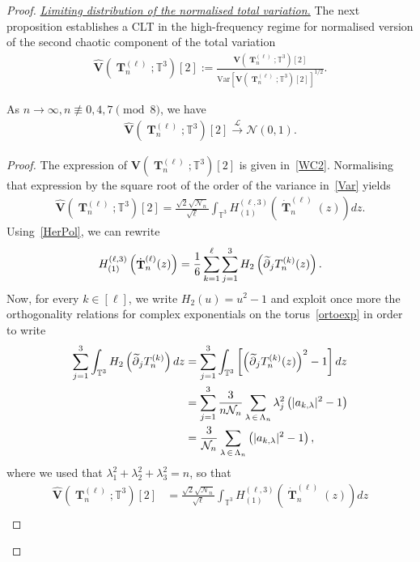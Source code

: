 \documentclass[AHL,Unicode,longabstracts,published]{cedram}
\DeclareMathOperator{\bT}{\mathbf{T}}
\newcommand{\scN}{\mathscr{N}}
\newcommand{\bfv}{\mathbf{V}}
\newcommand{\T}{\mathbb{T}^3}
\newcommand{\V}[1]{\mathrm{Var}{\left[#1\right]}}
\newcommand{\Law}{\xrightarrow[]{\mathcal{L}} }
\newcommand{\notcon}[3]{ {#1} \not\equiv {#2} \pmod {#3} }
\newcommand{\Nn}{\mathcal{N}_n}
\let\oldtilde\tilde
\renewcommand*{\tilde}[1]{\mathchoice{\widetilde{#1}}{\widetilde{#1}}{\oldtilde{#1}}{\oldtilde{#1}}}
\begin{document}
\begin{proof}
\medskip
\noindent\underline{\emph{Limiting distribution of the normalised total variation.}} The next proposition establishes a CLT in the high-frequency regime for normalised version of the second chaotic component of the total variation
\begin{gather}\label{nor2}
\widehat{\bfv}\left(\bT_n^{(\ell)};\T\right)[2]:=\frac{\bfv\left(\bT_n^{(\ell)};\T\right)[2]}{\V{\bfv\left(\bT_n^{(\ell)};\T\right)[2]}^{1/2}}.
\end{gather}

\begin{prop}\label{Lim2}
As $n\to \infty, \notcon{n}{0,4,7}{8}$, we have
\begin{gather*}
\widehat{\bfv}\left(\bT_n^{(\ell)};\T\right)[2] \Law \scN(0,1).
\end{gather*}
\end{prop}
\begin{proof}
The expression of $\bfv(\bT_n^{(\ell)};\T)[2]$ is given in~\eqref{WC2}. Normalising that expression by the square root of the order of the variance in~\eqref{Var} yields
\begin{gather*}
\widehat{\bfv}\left(\bT_n^{(\ell)};\T\right)[2] = \frac{\sqrt{2}\sqrt{\Nn}}{\sqrt{\ell}} \int_{\T} H_{(1)}^{(\ell,3)}\left(\dot{\bT}_n^{(\ell)}(z)\right) dz.
\end{gather*}
Using~\eqref{HerPol}, we can rewrite
\begin{gather*}
H_{(1)}^{(\ell,3)}\left(\dot{\bT}_n^{(\ell)}(z)\right) = \frac{1}{6}\sum_{k=1}^{\ell} \sum_{j=1}^{3} H_2\left(\tilde{\partial}_jT_n^{(k)}(z)\right).
\end{gather*}
Now, for every $k\in [\ell]$, we write $H_2(u)=u^2-1$ and exploit once more the orthogonality relations for complex exponentials on the torus~\eqref{ortoexp} in order to write
\begin{align*}
\sum_{j=1}^3\int_{\T} H_2\left(\tilde{\partial}_jT_n^{(k)}\right) dz &=\sum_{j=1}^3\int_{\T}\left[\left(\tilde{\partial}_jT_n^{(k)}(z)\right)^2 -1\right] dz \\
&=\sum_{j=1}^3\frac{3}{n\Nn} \sum_{\lambda\,\in\,\Lambda_n} \lambda_j^2\left(|a_{k,\lambda}|^2-1\right)\\
&= \frac{3}{\Nn}\sum_{\lambda\,\in \,\Lambda_n}\left(|a_{k,\lambda}|^2-1\right),
\end{align*}
where we used that $\lambda_1^2+\lambda_2^2+\lambda_3^2=n$, so that
\begin{equation}\label{tildaV2}
\begin{split}
\widehat{\bfv}\left(\bT_n^{(\ell)};\T\right)[2] &= \frac{\sqrt{2}\sqrt{\Nn}}{\sqrt{\ell}} \int_{\T} H_{(1)}^{(\ell,3)}\left(\dot{\bT}_n^{(\ell)}(z)\right) dz\\

\end{split}
\end{equation}
\end{proof}
\end{proof}
\end{document}
